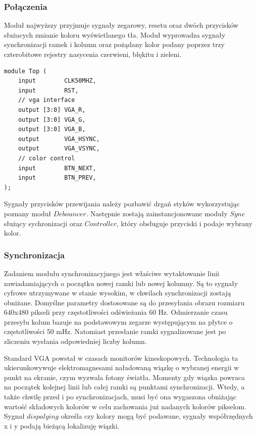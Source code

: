 \documentclass[a4paper,12pt]{article}
\begin{document}
\subsubsection{Połączenia}

Moduł najwyższy przyjmuje sygnały zegarowy, resetu oraz dwóch przycisków służacych zmianie koloru wyświetlanego tła. Moduł wyprowadza sygnały synchronizacji ramek i kolumn oraz pożądany kolor podany poprzez trzy czterobitowe rejestry nasycenia czerwieni, błękitu i zieleni.

\begin{lstlisting}[label=Topvga,caption=Top.v]
module Top (
    input        CLK50MHZ,
    input        RST,
    // vga interface
    output [3:0] VGA_R,
    output [3:0] VGA_G,
    output [3:0] VGA_B,
    output       VGA_HSYNC,
    output       VGA_VSYNC,
    // color control
    input        BTN_NEXT,
    input        BTN_PREV,
);
\end{lstlisting}

Sygnały przycisków przewijania należy pozbawić drgań styków wykorzystując poznany moduł $Debouncer$. Następnie zostają zainstancjonowane moduły $Sync$ służący sychronizacji oraz $Controller$, który obsługuje przyciski i podaje wybrany kolor.

\subsubsection{Synchronizacja}
Zadaniem modułu synchronizacyjnego jest właściwe wytaktowanie linii zawiadamiających o początku nowej ramki lub nowej kolumny. Są to sygnały cyfrowe utrzymywane w stanie wysokim, w chwilach synchronizacji zostają obniżane. Domyślne parametry dostosowane są do przesyłania obrazu rozmiaru 640x480 pikseli przy częstotliwości odświeżania 60 Hz. Odmierzanie czasu przesyłu kolum  bazuje na podstawowym zegarze występującym na płytce o częstotliwości 50 mHz. Natomiast przesłanie ramki sygnalizowane jest po zliczeniu wysłania odpowiedniej liczby kolumn.

Standard VGA powstał w czasach monitorów kineskopowych. Technologia ta ukierunkowywuje elektromagnesami naładowaną wiązkę o wybranej energii w punkt na ekranie, czym wyzwala fotony światła. Momenty gdy wiązka powraca na początek kolejnej linii lub całej ramki są punktami synchronizacji. Wtedy, a także chwilę przed i po synchronizacjach, musi być ona wygaszona obniżając wartość składowych kolorów w celu zachowania już nadanych kolorów pikselom. Sygnał $dispalying$ określa czy kolory mogą być podawane, sygnały współrzędnych x i y podają bieżącą lokalizuję wiązki.
\end{document}
